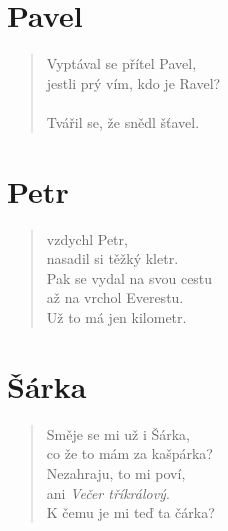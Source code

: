\section*{Pavel}
\begin{verse}
Vyptával se přítel Pavel,\\
jestli prý vím, kdo je Ravel?\\
\\
Tvářil se, že snědl šťavel.
\end{verse}

\section*{Petr}
\begin{verse}
 vzdychl Petr,\\
nasadil si těžký kletr.\\
Pak se vydal na svou cestu\\
až na vrchol Everestu.\\
Už to má jen kilometr.
\end{verse}

\section*{Šárka}
\begin{verse}
Směje se mi už i Šárka,\\
co že to mám za kašpárka?\\
Nezahraju, to mi poví,\\
ani \textit{Večer tříkrálový}.\\
K čemu je mi teď ta čárka?
\end{verse}










